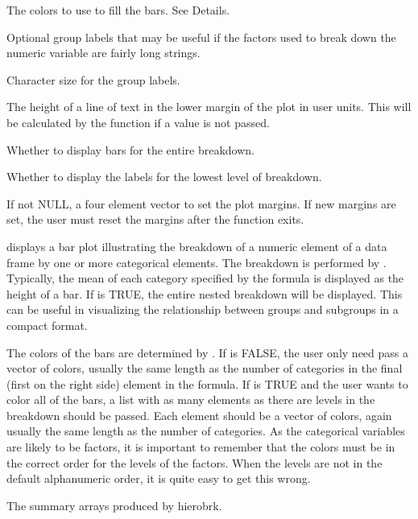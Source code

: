 \begin{Arguments}
\begin{ldescription}
\item[\code{col}] The colors to use to fill the bars. See Details.
\item[\code{barlabels}] Optional group labels that may be useful if the factors used to
break down the numeric variable are fairly long strings.
\item[\code{labelcex}] Character size for the group labels.
\item[\code{lineht}] The height of a line of text in the lower margin of the plot in user
units. This will be calculated by the function if a value is not passed.
\item[\code{showall}] Whether to display bars for the entire breakdown.
\item[\code{showbrklab}] Whether to display the labels for the lowest level of breakdown.
\item[\code{mar}] If not NULL, a four element vector to set the plot margins. If new margins
are set, the user must reset the margins after the function exits.
\end{ldescription}
\end{Arguments}
\begin{Details}\relax
{} displays a bar plot illustrating the breakdown of a numeric
element of a data frame by one or more categorical elements. The breakdown is
performed by . Typically, the mean of each category specified
by the formula is displayed as the height of a bar. If  is TRUE,
the entire nested breakdown will be displayed. This can be useful in
visualizing the relationship between groups and subgroups in a compact format.

The colors of the bars are determined by . If  is FALSE,
the user only need pass a vector of colors, usually the same length as the number
of categories in the final (first on the right side) element in the formula. If
 is TRUE and the user wants to color all of the bars, a list with
as many elements as there are levels in the breakdown should be passed. Each
element should be a vector of colors, again usually the same length as the number
of categories. As the categorical variables are likely to be factors, it is
important to remember that the colors must be in the correct order for the levels
of the factors. When the levels are not in the default alphanumeric order, it is
quite easy to get this wrong.
\end{Details}
\begin{Value}
The summary arrays produced by hierobrk.
\end{Value}
